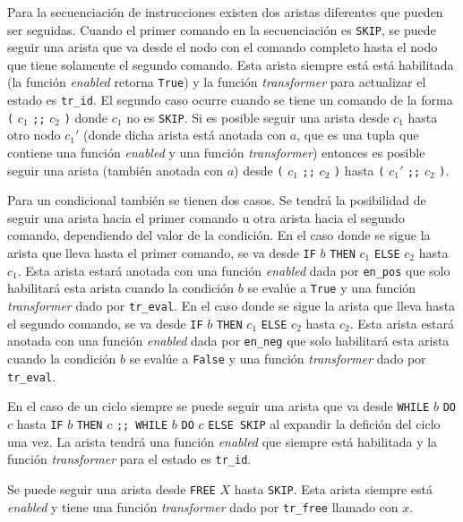 Para la secuenciación de instrucciones existen dos aristas diferentes que pueden ser seguidas.
Cuando el primer comando en la secuenciación es \verb|SKIP|, se puede seguir una arista que va desde el nodo con el comando completo hasta el nodo que tiene solamente el segundo comando.
Esta arista siempre está está habilitada (la función \textit{enabled} retorna \verb|True|) y la función \textit{transformer} para actualizar el estado es \verb|tr_id|.
El segundo caso ocurre cuando se tiene un comando de la forma \verb|(| $c_{1}$ \verb|;;| $c_{2}$ \verb|)| donde $c_{1}$ no es \verb|SKIP|.
Si es posible seguir una arista desde $c_{1}$ hasta otro nodo $c_{1}'$ (donde dicha arista está anotada con $a$, que es una tupla que contiene una función \textit{enabled} y una función \textit{transformer}) entonces es posible seguir una arista (también anotada con $a$) desde \verb|(| $c_{1}$ \verb|;;| $c_{2}$ \verb|)| hasta \verb|(| $c_{1}'$ \verb|;;| $c_{2}$ \verb|)|.

Para un condicional también se tienen dos casos.
Se tendrá la posibilidad de seguir una arista hacia el primer comando u otra arista hacia el segundo comando, dependiendo del valor de la condición.
En el caso donde se sigue la arista que lleva hasta el primer comando, se va desde \verb|IF| $b$ \verb|THEN| $c_{1}$ \verb|ELSE| $c_{2}$ hasta $c_{1}$.
Esta arista estará anotada con una función \textit{enabled} dada por \verb|en_pos| que solo habilitará esta arista cuando la condición $b$ se evalúe a \verb|True| y una función \textit{transformer} dado por \verb|tr_eval|.
En el caso donde se sigue la arista que lleva hasta el segundo comando, se va desde \verb|IF| $b$ \verb|THEN| $c_{1}$ \verb|ELSE| $c_{2}$ hasta $c_{2}$.
Esta arista estará anotada con una función \textit{enabled} dada por \verb|en_neg| que solo habilitará esta arista cuando la condición $b$ se evalúe a \verb|False| y una función \textit{transformer} dado por \verb|tr_eval|.

En el caso de un ciclo siempre se puede seguir una arista que va desde \verb|WHILE| $b$ \verb|DO| $c$ hasta \verb|IF| $b$ \verb|THEN| $c$ \verb|;; WHILE| $b$ \verb|DO| $c$ \verb|ELSE SKIP| al expandir la defición del ciclo una vez.
La arista tendrá una función \textit{enabled} que siempre está habilitada y la función \textit{transformer} para el estado es \verb|tr_id|.

Se puede seguir una arista desde \verb|FREE| $X$ hasta \verb|SKIP|.
Esta arista siempre está \textit{enabled} y tiene una función \textit{transformer} dado por \verb|tr_free| llamado con $x$.

